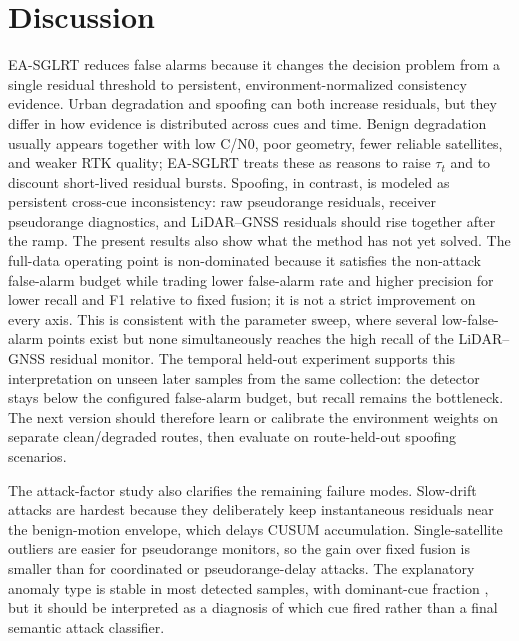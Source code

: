\documentclass[journal]{IEEEtran}
\begin{document}
\section{Discussion}
EA-SGLRT reduces false alarms because it changes the decision problem from a single residual threshold to persistent, environment-normalized consistency evidence.
Urban degradation and spoofing can both increase residuals, but they differ in how evidence is distributed across cues and time.
Benign degradation usually appears together with low C/N0, poor geometry, fewer reliable satellites, and weaker RTK quality; EA-SGLRT treats these as reasons to raise $\tau_t$ and to discount short-lived residual bursts.
Spoofing, in contrast, is modeled as persistent cross-cue inconsistency: raw pseudorange residuals, receiver pseudorange diagnostics, and LiDAR--GNSS residuals should rise together after the ramp.
The present results also show what the method has not yet solved.
The full-data operating point is non-dominated because it satisfies the non-attack false-alarm budget while trading lower false-alarm rate and higher precision for lower recall and F1 relative to fixed fusion; it is not a strict improvement on every axis.
This is consistent with the parameter sweep, where several low-false-alarm points exist but none simultaneously reaches the high recall of the LiDAR--GNSS residual monitor.
The temporal held-out experiment supports this interpretation on unseen later samples from the same collection: the detector stays below the configured false-alarm budget, but recall remains the bottleneck.
The next version should therefore learn or calibrate the environment weights on separate clean/degraded routes, then evaluate on route-held-out spoofing scenarios.

The attack-factor study also clarifies the remaining failure modes.
Slow-drift attacks are hardest because they deliberately keep instantaneous residuals near the benign-motion envelope, which delays CUSUM accumulation.
Single-satellite outliers are easier for pseudorange monitors, so the gain over fixed fusion is smaller than for coordinated or pseudorange-delay attacks.
The explanatory anomaly type is stable in most detected samples, with dominant-cue fraction \AttackClassificationDominantFraction{}, but it should be interpreted as a diagnosis of which cue fired rather than a final semantic attack classifier.
\end{document}
